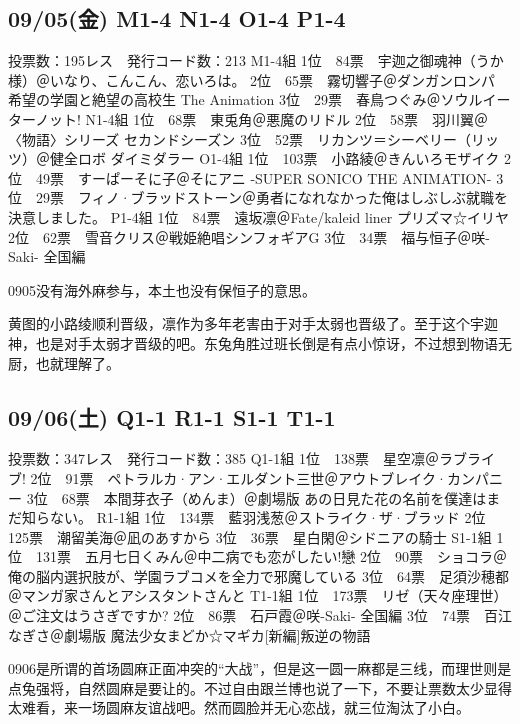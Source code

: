 \subsection{09/05(金) M1-4 N1-4 O1-4 P1-4}

    投票数：195レス　発行コード数：213
    M1-4組
    1位　84票　宇迦之御魂神（うか様）＠いなり、こんこん、恋いろは。
    2位　65票　霧切響子＠ダンガンロンパ 希望の学園と絶望の高校生 The Animation
    3位　29票　春鳥つぐみ＠ソウルイーターノット!
    N1-4組
    1位　68票　東兎角＠悪魔のリドル
    2位　58票　羽川翼＠〈物語〉シリーズ セカンドシーズン
    3位　52票　リカンツ＝シーベリー（リッツ）＠健全ロボ ダイミダラー
    O1-4組
    1位　103票　小路綾＠きんいろモザイク
    2位　49票　すーぱーそに子＠そにアニ -SUPER SONICO THE ANIMATION-
    3位　29票　フィノ·ブラッドストーン＠勇者になれなかった俺はしぶしぶ就職を決意しました。
    P1-4組
    1位　84票　遠坂凛＠Fate/kaleid liner プリズマ☆イリヤ
    2位　62票　雪音クリス＠戦姫絶唱シンフォギアG
    3位　34票　福与恒子＠咲-Saki- 全国編

0905没有海外麻参与，本土也没有保恒子的意思。

黄图的小路绫顺利晋级，凛作为多年老害由于对手太弱也晋级了。至于这个宇迦神，也是对手太弱才晋级的吧。东兔角胜过班长倒是有点小惊讶，不过想到物语无厨，也就理解了。

\subsection{09/06(土) Q1-1 R1-1 S1-1 T1-1}

    投票数：347レス　発行コード数：385
    Q1-1組
    1位　138票　星空凛＠ラブライブ!
    2位　91票　ペトラルカ·アン·エルダント三世＠アウトブレイク·カンパニー
    3位　68票　本間芽衣子（めんま）＠劇場版 あの日見た花の名前を僕達はまだ知らない。
    R1-1組
    1位　134票　藍羽浅葱＠ストライク·ザ·ブラッド
    2位　125票　潮留美海＠凪のあすから
    3位　36票　星白閑＠シドニアの騎士
    S1-1組
    1位　131票　五月七日くみん＠中二病でも恋がしたい!戀
    2位　90票　ショコラ＠俺の脳内選択肢が、学園ラブコメを全力で邪魔している
    3位　64票　足須沙穂都＠マンガ家さんとアシスタントさんと
    T1-1組
    1位　173票　リゼ（天々座理世）＠ご注文はうさぎですか?
    2位　86票　石戸霞＠咲-Saki- 全国編
    3位　74票　百江なぎさ＠劇場版 魔法少女まどか☆マギカ[新編]叛逆の物語

0906是所谓的首场圆麻正面冲突的“大战”，但是这一圆一麻都是三线，而理世则是点兔强将，自然圆麻是要让的。不过自由跟兰博也说了一下，不要让票数太少显得太难看，来一场圆麻友谊战吧。然而圆脸并无心恋战，就三位淘汰了小白。

